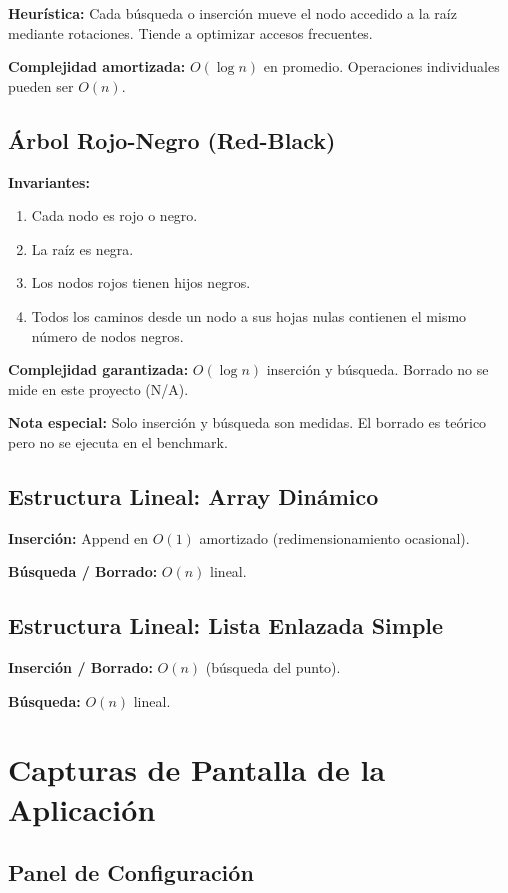 \documentclass[12pt,a4paper]{article}
\begin{document}
\textbf{Heurística:} Cada búsqueda o inserción mueve el nodo accedido a la raíz mediante rotaciones. Tiende a optimizar accesos frecuentes.

\textbf{Complejidad amortizada:} $O(\log n)$ en promedio. Operaciones individuales pueden ser $O(n)$.

\subsection{Árbol Rojo-Negro (Red-Black)}

\textbf{Invariantes:}
\begin{enumerate}
    \item Cada nodo es rojo o negro.
    \item La raíz es negra.
    \item Los nodos rojos tienen hijos negros.
    \item Todos los caminos desde un nodo a sus hojas nulas contienen el mismo número de nodos negros.
\end{enumerate}

\textbf{Complejidad garantizada:} $O(\log n)$ inserción y búsqueda. Borrado no se mide en este proyecto (N/A).

\textbf{Nota especial:} Solo inserción y búsqueda son medidas. El borrado es teórico pero no se ejecuta en el benchmark.

\subsection{Estructura Lineal: Array Dinámico}

\textbf{Inserción:} Append en $O(1)$ amortizado (redimensionamiento ocasional).

\textbf{Búsqueda / Borrado:} $O(n)$ lineal.

\subsection{Estructura Lineal: Lista Enlazada Simple}

\textbf{Inserción / Borrado:} $O(n)$ (búsqueda del punto).

\textbf{Búsqueda:} $O(n)$ lineal.

\section{Capturas de Pantalla de la Aplicación}

\subsection{Panel de Configuración}
\end{document}
